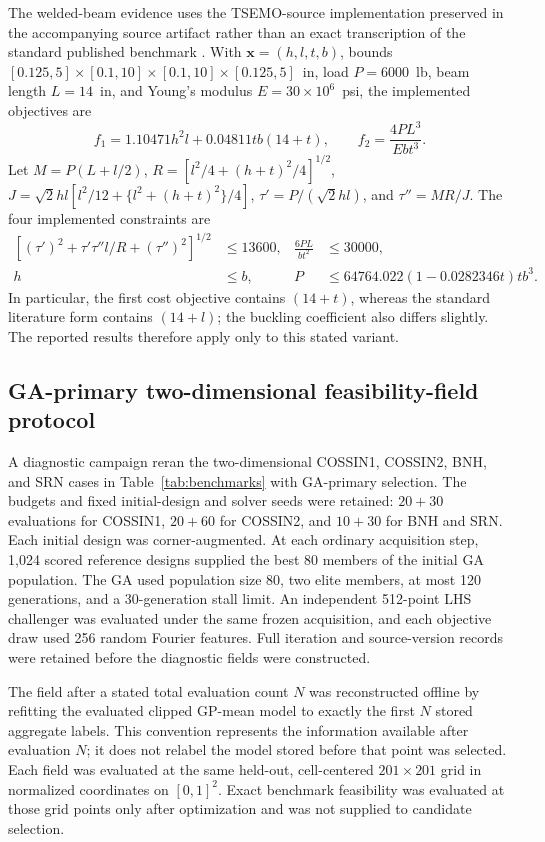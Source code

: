 \documentclass[twoside]{article}
\begin{document}
The welded-beam evidence uses the TSEMO-source implementation preserved in the
accompanying source artifact rather than an exact transcription of the
standard published benchmark \cite{ray2002society}. With
\(\mathbf x=(h,l,t,b)\), bounds
\([0.125,5]\times[0.1,10]\times[0.1,10]\times[0.125,5]\)~in, load
\(P=6000\)~lb, beam length \(L=14\)~in, and Young's modulus
\(E=30\times10^6\)~psi, the implemented objectives are
\begin{equation}
 f_1=1.10471h^2l+0.04811tb(14+t),\qquad
 f_2=\frac{4PL^3}{Ebt^3}.
 \label{eq:welded-beam-objectives}
\end{equation}
Let \(M=P(L+l/2)\),
\(R=[l^2/4+(h+t)^2/4]^{1/2}\),
\(J=\sqrt2hl[l^2/12+\{l^2+(h+t)^2\}/4]\),
\(\tau'=P/(\sqrt2hl)\), and \(\tau''=MR/J\). The four implemented
constraints are
\begin{align}
 \left[(\tau')^2+\tau'\tau''l/R+(\tau'')^2\right]^{1/2}&\leq13600,
 &\frac{6PL}{bt^2}&\leq30000,\nonumber\\
 h&\leq b,
 &P&\leq64764.022(1-0.0282346t)tb^3.
 \label{eq:welded-beam-constraints}
\end{align}
In particular, the first cost objective contains \((14+t)\), whereas the
standard literature form contains \((14+l)\); the buckling coefficient also
differs slightly. The reported results therefore apply only to this stated
variant.

\subsection{GA-primary two-dimensional feasibility-field protocol}
\label{sec:current-2d-protocol}

A diagnostic campaign reran the two-dimensional COSSIN1,
COSSIN2, BNH, and SRN cases in Table~\ref{tab:benchmarks} with GA-primary
selection.  The budgets and fixed
initial-design and solver seeds were retained: \(20+30\) evaluations for
COSSIN1, \(20+60\) for COSSIN2, and \(10+30\) for BNH and SRN.  Each initial
design was corner-augmented.  At each ordinary acquisition step, 1,024 scored
reference designs supplied the best 80 members of the initial GA population.
The GA used population size 80, two elite members, at most 120 generations,
and a 30-generation stall limit.  An independent 512-point LHS challenger was
evaluated under the same frozen acquisition, and each objective draw used 256
random Fourier features. Full iteration and source-version records were
retained before the diagnostic fields were constructed.

The field after a stated total evaluation count \(N\) was reconstructed
offline by refitting the evaluated clipped GP-mean model to exactly the first
\(N\) stored aggregate labels.  This convention represents the information
available after evaluation \(N\); it does not relabel the model stored before
that point was selected. Each field was evaluated at the same held-out,
cell-centered \(201\times201\) grid in normalized coordinates on
\([0,1]^2\).  Exact benchmark feasibility was evaluated at those grid points
only after optimization and was not supplied to candidate selection.
\end{document}
